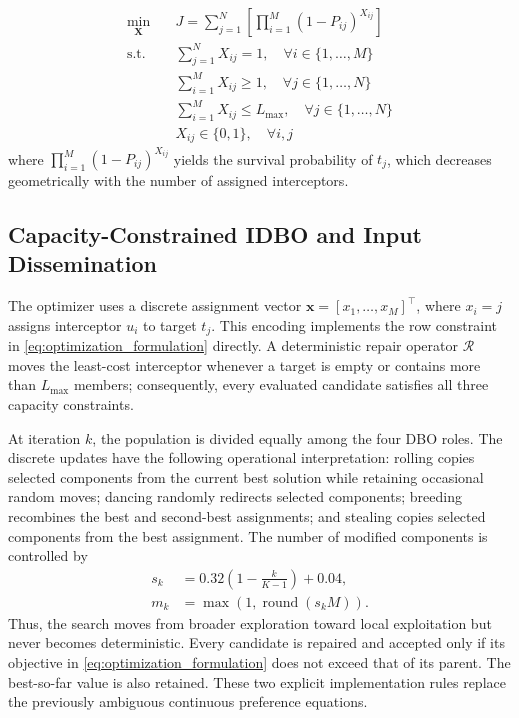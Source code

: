 \documentclass[lettersize,journal]{IEEEtran}
\begin{document}
\begin{equation}
\label{eq:optimization_formulation}
\begin{aligned}
\min_{\mathbf{X}} \quad & J = \sum_{j=1}^{N} \left[ \prod_{i=1}^{M} \left(1 - P_{ij}\right)^{X_{ij}} \right] \\
\text{s.t.} \quad & \sum_{j=1}^{N} X_{ij} = 1, \quad \forall i \in \{1,\dots,M\} \\
& \sum_{i=1}^{M} X_{ij} \geq 1, \quad \forall j \in \{1,\dots,N\} \\
& \sum_{i=1}^{M} X_{ij} \leq L_{\max}, \quad \forall j \in \{1,\dots,N\} \\
& X_{ij} \in \{0,1\}, \quad \forall i,j
\end{aligned}
\end{equation}
where $\prod_{i=1}^{M} (1 - P_{ij})^{X_{ij}}$ yields the survival probability of $t_j$, which decreases geometrically with the number of assigned interceptors.

\subsection{Capacity-Constrained IDBO and Input Dissemination}
\label{subsec:idbo_algorithm}

The optimizer uses a discrete assignment vector
\(\mathbf{x}=[x_1,\ldots,x_M]^\top\), where \(x_i=j\) assigns interceptor
\(u_i\) to target \(t_j\). This encoding implements the row constraint in
\eqref{eq:optimization_formulation} directly. A deterministic repair operator
\(\mathcal{R}\) moves the least-cost interceptor whenever a target is empty or
contains more than \(L_{\max}\) members; consequently, every evaluated candidate
satisfies all three capacity constraints.

At iteration \(k\), the population is divided equally among the four DBO roles.
The discrete updates have the following operational interpretation: rolling
copies selected components from the current best solution while retaining
occasional random moves; dancing randomly redirects selected components;
breeding recombines the best and second-best assignments; and stealing copies
selected components from the best assignment. The number of modified components
is controlled by
\begin{align}
\label{eq:idbo_schedule}
s_k&=0.32\left(1-\frac{k}{K-1}\right)+0.04,\\
m_k&=\max(1,\operatorname{round}(s_k M)).
\end{align}
Thus, the search moves from broader exploration toward local exploitation but
never becomes deterministic. Every candidate is repaired and accepted only if
its objective in \eqref{eq:optimization_formulation} does not exceed that of its
parent. The best-so-far value is also retained. These two explicit implementation
rules replace the previously ambiguous continuous preference equations.
\end{document}
